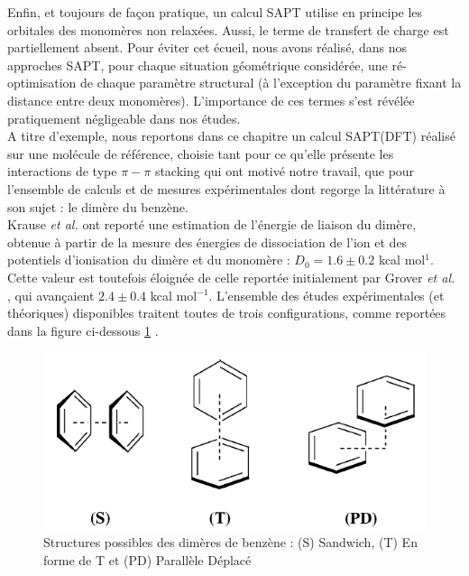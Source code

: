 	
	Enfin, et toujours de façon pratique, un calcul SAPT utilise en principe les orbitales des monomères non relaxées. Aussi, le terme de transfert de charge est partiellement absent. Pour éviter cet écueil, nous avons réalisé, dans nos approches SAPT, pour chaque situation géométrique considérée, une ré-optimisation de chaque paramètre structural (à l'exception du paramètre fixant la distance entre deux monomères). L’importance de ces termes s’est révélée pratiquement négligeable dans nos études.\\
	
	A titre d’exemple, nous reportons dans ce chapitre un calcul SAPT(DFT) réalisé sur une molécule de référence, choisie tant pour ce qu'elle présente les interactions de type $\pi-\pi$ stacking qui ont motivé notre travail, que pour l'ensemble de calculs et de mesures expérimentales dont regorge la littérature à son sujet : le dimère du benzène. \\
	
	Krause \textit{et al.} \cite{krause1991binding} ont reporté une estimation de l’énergie de liaison du dimère, obtenue à partir de la mesure des énergies de dissociation de l'ion et des potentiels d’ionisation du dimère et du monomère : $D_{0}= 1.6 \pm 0.2$ kcal mol$^{1}$. Cette valeur est toutefois éloignée de celle reportée initialement par Grover \textit{et al.} \cite{grover1987dissociation}, qui avançaient $2.4 \pm 0.4$ kcal mol$^{-1}$. 
	L’ensemble des études expérimentales (et théoriques) disponibles traitent toutes de trois configurations, comme reportées dans la figure ci-dessous \ref{figprot} .
	
	\begin{figure}[H]
		\centering
		\includegraphics[scale=0.8]{image/Prot} 
		\caption[Structures du dimère de Benzène]{Structures possibles des dimères de benzène : (S) Sandwich, (T) En forme de T et (PD) Parallèle Déplacé} \label{figprot}
	\end{figure}
	
